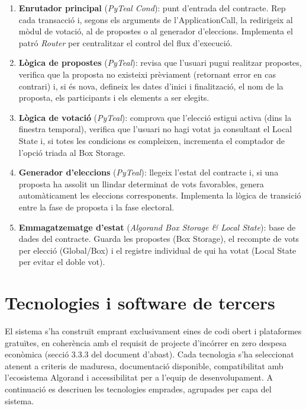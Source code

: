 \begin{enumerate}[label=\roman*.]
    \item \textbf{Enrutador principal} (\textit{PyTeal Cond}): punt d'entrada del contracte. Rep cada transacció i, segons els arguments de l'ApplicationCall, la redirigeix al mòdul de votació, al de propostes o al generador d'eleccions. Implementa el patró \textit{Router} per centralitzar el control del flux d'execució.
 
    \item \textbf{Lògica de propostes} (\textit{PyTeal}): revisa que l'usuari pugui realitzar propostes, verifica que la proposta no existeixi prèviament (retornant error en cas contrari) i, si és nova, defineix les dates d'inici i finalització, el nom de la proposta, els participants i els elements a ser elegits.
 
    \item \textbf{Lògica de votació} (\textit{PyTeal}): comprova que l'elecció estigui activa (dins la finestra temporal), verifica que l'usuari no hagi votat ja consultant el Local State i, si totes les condicions es compleixen, incrementa el comptador de l'opció triada al Box Storage.
 
    \item \textbf{Generador d'eleccions} (\textit{PyTeal}): llegeix l'estat del contracte i, si una proposta ha assolit un llindar determinat de vots favorables, genera automàticament les eleccions corresponents. Implementa la lògica de transició entre la fase de proposta i la fase electoral.
 
    \item \textbf{Emmagatzematge d'estat} (\textit{Algorand Box Storage \& Local State}): base de dades del contracte. Guarda les propostes (Box Storage), el recompte de vots per elecció (Global/Box) i el registre individual de qui ha votat (Local State per evitar el doble vot).
\end{enumerate}
 
 
\section{Tecnologies i software de tercers}
 
El sistema s'ha construït emprant exclusivament eines de codi obert i plataformes gratuïtes, en coherència amb el requisit de projecte d'incórrer en zero despesa econòmica (secció 3.3.3 del document d'abast). Cada tecnologia s'ha seleccionat atenent a criteris de maduresa, documentació disponible, compatibilitat amb l'ecosistema Algorand i accessibilitat per a l'equip de desenvolupament. A continuació es descriuen les tecnologies emprades, agrupades per capa del sistema.
 
